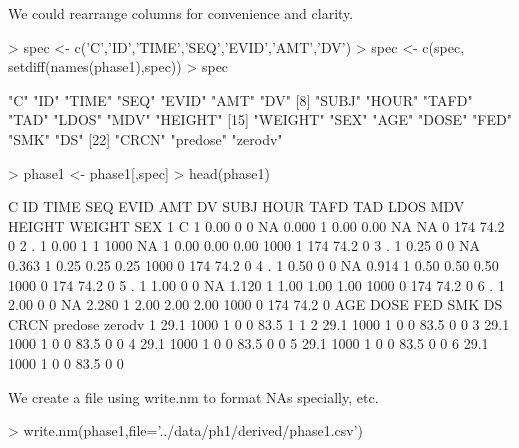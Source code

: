We could rearrange columns for convenience and clarity.
\begin{Schunk}
\begin{Sinput}
> spec <- c('C','ID','TIME','SEQ','EVID','AMT','DV')
> spec <- c(spec, setdiff(names(phase1),spec))
> spec
\end{Sinput}
\begin{Soutput}
 [1] "C"       "ID"      "TIME"    "SEQ"     "EVID"    "AMT"     "DV"     
 [8] "SUBJ"    "HOUR"    "TAFD"    "TAD"     "LDOS"    "MDV"     "HEIGHT" 
[15] "WEIGHT"  "SEX"     "AGE"     "DOSE"    "FED"     "SMK"     "DS"     
[22] "CRCN"    "predose" "zerodv" 
\end{Soutput}
\begin{Sinput}
> phase1 <- phase1[,spec]
> head(phase1)
\end{Sinput}
\begin{Soutput}
  C ID TIME SEQ EVID  AMT    DV SUBJ HOUR TAFD  TAD LDOS MDV HEIGHT WEIGHT SEX
1 C  1 0.00   0    0   NA 0.000    1 0.00 0.00   NA   NA   0    174   74.2   0
2 .  1 0.00   1    1 1000    NA    1 0.00 0.00 0.00 1000   1    174   74.2   0
3 .  1 0.25   0    0   NA 0.363    1 0.25 0.25 0.25 1000   0    174   74.2   0
4 .  1 0.50   0    0   NA 0.914    1 0.50 0.50 0.50 1000   0    174   74.2   0
5 .  1 1.00   0    0   NA 1.120    1 1.00 1.00 1.00 1000   0    174   74.2   0
6 .  1 2.00   0    0   NA 2.280    1 2.00 2.00 2.00 1000   0    174   74.2   0
   AGE DOSE FED SMK DS CRCN predose zerodv
1 29.1 1000   1   0  0 83.5       1      1
2 29.1 1000   1   0  0 83.5       0      0
3 29.1 1000   1   0  0 83.5       0      0
4 29.1 1000   1   0  0 83.5       0      0
5 29.1 1000   1   0  0 83.5       0      0
6 29.1 1000   1   0  0 83.5       0      0
\end{Soutput}
\end{Schunk}
We create a file using write.nm to format NAs specially, etc.
\begin{Schunk}
\begin{Sinput}
> write.nm(phase1,file='../data/ph1/derived/phase1.csv')
\end{Sinput}
\end{Schunk}





